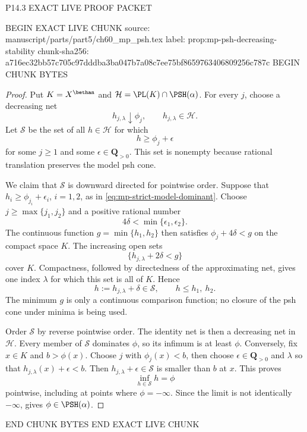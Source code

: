 P14.3 EXACT LIVE PROOF PACKET

BEGIN EXACT LIVE CHUNK
source: manuscript/parts/part5/ch60_mp_psh.tex
label: prop:mp-psh-decreasing-stability
chunk-sha256: a716ec32bb57c705c97dddba3ba047b7a08c7ee75bf8659763406809256c787c
BEGIN CHUNK BYTES
\begin{proof}
Put \(K=X^{\bethan}\) and
\(\mathcal H=\PL(K)\cap\PSH(\alpha)\).  For every \(j\), choose a
decreasing net
\[
                    h_{j,\lambda}\downarrow\phi_j,
                    \qquad h_{j,\lambda}\in\mathcal H.
\]
Let \(\mathcal S\) be the set of all \(h\in\mathcal H\) for which
\[
                  h\geq\phi_j+\epsilon
\tag{60.16a}\label{eq:mp-strict-model-dominant}
\]
for some \(j\geq1\) and some \(\epsilon\in\mathbf Q_{>0}\).  This set is
nonempty because rational translation preserves the model psh cone.

We claim that \(\mathcal S\) is downward directed for pointwise order.
Suppose that \(h_i\geq\phi_{j_i}+\epsilon_i\), \(i=1,2\), as in
\eqref{eq:mp-strict-model-dominant}.  Choose
\(j\geq\max\{j_1,j_2\}\) and a positive rational number
\[
                  4\delta<\min\{\epsilon_1,\epsilon_2\}.
\]
The continuous function \(g=\min\{h_1,h_2\}\) then satisfies
\(\phi_j+4\delta<g\) on the compact space \(K\).  The increasing open
sets
\[
                  \{h_{j,\lambda}+2\delta<g\}
\]
cover \(K\).  Compactness, followed by directedness of the approximating
net, gives one index \(\lambda\) for which this set is all of \(K\).
Hence
\[
                  h:=h_{j,\lambda}+\delta\in\mathcal S,
                  \qquad h\leq h_1,\ h_2.
\]
The minimum \(g\) is only a continuous comparison function; no closure of
the psh cone under minima is being used.

Order \(\mathcal S\) by reverse pointwise order.  The identity net is then
a decreasing net in \(\mathcal H\).  Every member of \(\mathcal S\)
dominates \(\phi\), so its infimum is at least \(\phi\).  Conversely, fix
\(x\in K\) and \(b>\phi(x)\).  Choose \(j\) with \(\phi_j(x)<b\), then
choose \(\epsilon\in\mathbf Q_{>0}\) and \(\lambda\) so that
\(h_{j,\lambda}(x)+\epsilon<b\).  Then
\(h_{j,\lambda}+\epsilon\in\mathcal S\) is smaller than \(b\) at
\(x\).  This proves
\[
                         \inf_{h\in\mathcal S}h=\phi
\]
pointwise, including at points where \(\phi=-\infty\).  Since the limit is
not identically \(-\infty\),  gives
\(\phi\in\PSH(\alpha)\).
\end{proof}
END CHUNK BYTES
END EXACT LIVE CHUNK

